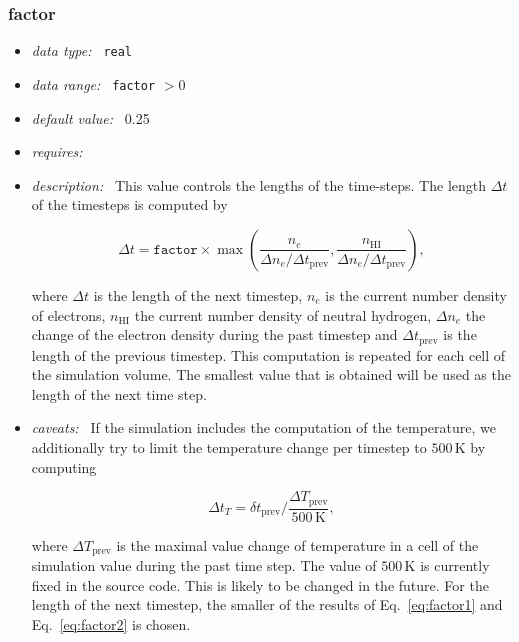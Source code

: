 \documentclass[a4paper,10pt]{article}
\begin{document}
\subsubsection{factor}
\label{opt:factor}
\begin{itemize}
 \item \textit{data type:~} \texttt{real}
 \item \textit{data range:~}  \texttt{factor} $> 0$
 \item \textit{default value:~} 0.25
 \item \textit{requires:~}
 \item \textit{description:~} This value controls the lengths of the time-steps.
  The length $\Delta t$ of the timesteps is computed by

  \begin{equation}
  \Delta t = \mathtt{factor} \times \max 
  \left(\frac{n_e}{\Delta n_e / \Delta t_\mathrm{prev}},  
  \frac{n_\mathrm{H I}}{\Delta n_e / \Delta t_\mathrm{prev}} \right),
  \label{eq:factor1}
  \end{equation}

  where $\Delta t$ is the length of the next timestep, $n_e$ is the current 
  number density 
  of electrons, $n_\mathrm{H I}$ the current number density of neutral 
  hydrogen, $\Delta n_e$ the change of the electron density during the past 
  timestep and $\Delta t_\mathrm{prev}$ is the length of the previous timestep. 
  This computation is repeated for each cell of the simulation volume. The 
  smallest value that is obtained will be used as the length of the next time 
  step.
 \item \textit{caveats:~} If the simulation includes the computation of the 
  temperature, we additionally try to limit the temperature change per timestep 
  to $500\,\mathrm{K}$ by computing

  \begin{equation}
   \Delta t_T = \delta 
   t_\mathrm{prev}/\frac{\Delta T_\mathrm{prev}}{500\,\mathrm{K}},
  \label{eq:factor2}
  \end{equation}

  where $\Delta T_\mathrm{prev}$ is the maximal value change of temperature in 
  a cell of the simulation value during the past time step.  The value of 
  $500\,\mathrm{K}$ is currently fixed in the source code. This is likely to be 
  changed in the future.
  For the length of the next timestep, the smaller of the results of 
  Eq.~\ref{eq:factor1} and Eq.~\ref{eq:factor2} is chosen.   
\end{itemize}
\end{document}
